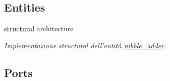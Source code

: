 \subsection*{Entities}
\begin{DoxyCompactItemize}
\item 
\hyperlink{classnibble__adder_1_1structural}{structural} architecture
\begin{DoxyCompactList}\small\item\em Implementazione structural dell'entità \hyperlink{classnibble__adder}{nibble\+\_\+adder}. \end{DoxyCompactList}\end{DoxyCompactItemize}
\subsection*{Ports}
